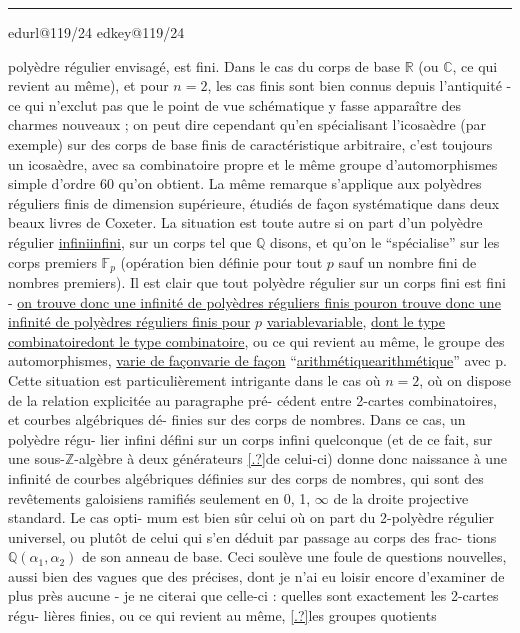 \documentclass[11pt,a4paper]{article}
\makeatletter
\newif\ifdiplomatic
\newif\ifreading
\def\CurrentScanURL{}
\def\CurrentPageKey{}
\def\CurrentApparatus{}
\newcounter{appnote}
\newcommand{\scanpage}[1]{%
  \clearpage
  \expandafter\let\expandafter\CurrentScanURL\csname edurl@#1\endcsname
  \expandafter\let\expandafter\CurrentPageKey\csname edkey@#1\endcsname
  \def\CurrentApparatus{}%
  \hypertarget{scan-\CurrentPageKey}{}%
  \typeout{EDITION-SCAN: \CurrentPageKey; PDFPAGE: \the\numexpr\ReadonlyShipoutCounter+1\relax}%
  \ifreading
    \marginnote{\raggedright\scriptsize\sffamily\href{\CurrentScanURL}{119 / \csname edpage@#1\endcsname}}%
  \else
    \noindent{\small\sffamily\href{\CurrentScanURL}{[scan #1]}}\par\smallskip
  \fi}
\newcommand{\mspage}[1]{%
  \ifreading\marginnote{\raggedright\scriptsize\sffamily p.\,#1}[2\baselineskip]%
  \else\noindent{\small\sffamily[p.\,#1]}\par\smallskip\fi}
\let\TextUline\uline
\renewcommand{\uline}[1]{\ifmmode\underline{#1}\else\TextUline{#1}\fi}
\newcommand{\unsure}[1]{\href{\CurrentScanURL}{[#1?]}}
\newcommand{\AppItem}[2]{%
  \ifcsdef{edvariant@#2}{%
    \ifcsempty{edvariant@#2}{\PackageError{Esquisse}{Empty apparatus entry #2}{Every executed apparatus marker requires its printed note.}}{}%
  }{\PackageError{Esquisse}{Undefined apparatus entry #2}{Every executed apparatus marker requires its printed note.}}%
  \typeout{EDITION-APP-ENTRY: #2; NUMBER: #1}%
  \par\noindent\textsuperscript{#1}\csname edvariant@#2\endcsname}
\newcommand{\EditionApp}[1]{%
  \stepcounter{appnote}%
  \ifmmode{}^{\scriptscriptstyle\theappnote}\else\textsuperscript{\theappnote}\fi
  \begingroup\edef\x{\endgroup\noexpand\gappto\noexpand\CurrentApparatus{\noexpand\AppItem{\theappnote}{#1}}}\x}
\newcommand{\var}[4]{\ifdiplomatic#1\else#2\ifreading\else\EditionApp{#4}\fi\fi}
\newcommand{\finishscan}{\ifx\CurrentApparatus\empty\else\par\bigskip\noindent\rule{.35\linewidth}{.35pt}\par\smallskip{\footnotesize\setlength{\parskip}{3pt}\CurrentApparatus}\fi}
\makeatother
\begin{document}
\finishscan
\scanpage{119/24}
\mspage{22}

polyèdre régulier envisagé, est fini. Dans le cas du corps de
base $\mathbb{R}$ (ou $\mathbb{C}$, ce qui revient au même), et pour $n = 2$, les cas
finis sont bien connus depuis l'antiquité - ce qui n'exclut pas
que le point de vue schématique y fasse apparaître des charmes
\var{nouveau ;}{nouveaux ;}{slip corrected}{V-FR-024-001} on peut dire cependant qu'en spécialisant \var{l'isosaèdre}{l'icosaèdre}{slip corrected}{V-FR-024-002}
(par exemple) sur des corps de base finis de caractéristique
arbitraire, c'est toujours un icosaèdre, avec sa combinatoire
propre et le même groupe d'automorphismes simple d'ordre 60 qu'on
obtient. La même remarque s'applique aux polyèdres réguliers finis
de dimension supérieure, étudiés de façon systématique dans deux
beaux livres de Coxeter. La situation est toute autre si on part
d'un polyèdre régulier \uline{infini}, sur un corps tel que $\mathbb{Q}$ disons,
et qu'on le ``spécialise'' sur les corps premiers $\mathbb{F}_p$ (opération
bien définie pour tout $p$ sauf un nombre fini de nombres premiers).
Il est clair que tout polyèdre régulier sur un corps fini est fini -
\uline{on trouve donc une infinité de polyèdres réguliers finis pour} $p$
\uline{variable}, \uline{dont le type combinatoire}, ou ce qui revient au même,
le groupe des automorphismes, \uline{varie de façon} ``\uline{arithmétique}'' avec p.
Cette situation est particulièrement intrigante  dans le cas où
$n = 2$, où on dispose de la relation explicitée au paragraphe pré-%
cédent entre 2-cartes combinatoires, et courbes algébriques dé-%
finies sur des corps de nombres. Dans ce cas, un polyèdre régu-%
lier infini défini sur un corps infini quelconque (et de ce fait,
sur une sous-$\mathbb{Z}$-algèbre à deux générateurs \unsure{.}de celui-ci) donne donc
naissance à une infinité de courbes algébriques définies sur des
corps de nombres, qui sont des revêtements galoisiens ramifiés
seulement en 0, 1, $\infty$ de la droite projective standard. Le cas opti-%
mum est bien sûr celui où on part du 2-polyèdre régulier universel,
ou plutôt de celui qui s'en déduit par passage au corps des frac-%
tions $\mathbb{Q}(\alpha_1,\alpha_2)$ de son anneau de base. Ceci soulève une foule de
questions nouvelles, aussi bien des vagues que des précises, dont
je n'ai eu loisir encore d'examiner de plus près aucune - je ne
citerai que celle-ci : quelles sont exactement les 2-cartes régu-%
lières finies, ou ce qui revient au même, \unsure{.}les groupes quotients
\end{document}
